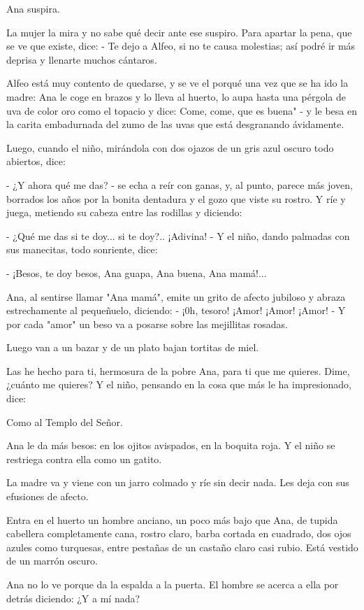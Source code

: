 \documentclass[12pt, twoside, openright]{book} %
\begin{document}
Ana suspira. 

La mujer la mira y no sabe qué decir ante ese suspiro. Para apartar la pena, que se ve que existe, dice: - Te dejo a Alfeo, si no te causa molestias; así podré ir más deprisa y llenarte muchos cántaros. 

Alfeo está muy contento de quedarse, y se ve el porqué una vez que se ha ido la madre: Ana le coge en brazos y lo lleva al huerto, lo aupa hasta una pérgola de uva de color oro como el topacio y dice: Come, come, que es buena" - y le besa en la carita embadurnada del zumo de las uvas que está desgranando ávidamente. 

Luego, cuando el niño, mirándola con dos ojazos de un gris azul oscuro todo abiertos, dice: 

- ¿Y ahora qué me das? - se echa a reír con ganas, y, al punto, parece más joven, borrados los años por la bonita dentadura y el gozo que viste su rostro. Y ríe y juega, metiendo su cabeza entre las rodillas y diciendo: 

- ¿Qué me das si te doy... si te doy?.. ¡Adivina! - Y el niño, dando palmadas con sus manecitas, todo sonriente, dice: 

- ¡Besos, te doy besos, Ana guapa, Ana buena, Ana mamá!... 

Ana, al sentirse llamar "Ana mamá", emite un grito de afecto jubiloso y abraza estrechamente al pequeñuelo, diciendo: - ¡0h, tesoro! ¡Amor! ¡Amor! ¡Amor! - Y por cada "amor" un beso va a posarse sobre las mejillitas rosadas. 

Luego van a un bazar y de un plato bajan tortitas de miel. 

Las he hecho para ti, hermosura de la pobre Ana, para ti que me quieres. Dime, ¿cuánto me quieres? Y el niño, pensando en la cosa que más le ha impresionado, dice: 

Como al Templo del Señor. 

Ana le da más besos: en los ojitos avispados, en la boquita roja. Y el niño se restriega contra ella como un gatito. 

La madre va y viene con un jarro colmado y ríe sin decir nada. Les deja con sus efusiones de afecto. 

Entra en el huerto un hombre anciano, un poco más bajo que Ana, de tupida cabellera completamente cana, rostro claro, barba cortada en cuadrado, dos ojos azules como turquesas, entre pestañas de un castaño claro casi rubio. Está vestido de un marrón oscuro. 

Ana no lo ve porque da la espalda a la puerta. El hombre se acerca a ella por detrás diciendo: ¿Y a mí nada? 
\end{document}
